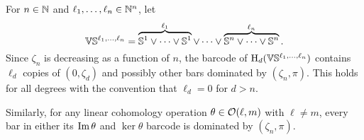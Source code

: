 For $n \in \mathbb{N}$ and $\ell_1, \dots, \ell_n \in \mathbb{N}^n$, let
\[
\mathbb{V}\mathbb{S}^{\ell_1,\dots,\ell_n} = 
\overbrace{\mathbb{S}^1\vee\dots\vee\mathbb{S}^1}^{\ell_1} \vee\dots\vee \overbrace{\mathbb{S}^n\vee\dots\vee\mathbb{S}^n}^{\ell_n}.
\]
Since $\zeta_{n}$ is decreasing as a function of $n$, the barcode of $\mathrm{H}_d(\mathbb{V}\mathbb{S}^{\ell_1,\dots,\ell_n})$ contains $\ell_d$ copies of $(0,\zeta_d)$ and possibly other bars dominated by $(\zeta_n,\pi)$.
This holds for all degrees with the convention that $\ell_d = 0$ for $d > n$. 

Similarly, for any linear cohomology operation $\theta \in \mathcal{O}(\ell,m)$ with $\ell \neq m$, every bar in either its $\operatorname{Im}\theta$ and $\ker\theta$ barcode is dominated by $(\zeta_n, \pi)$.

%
%




